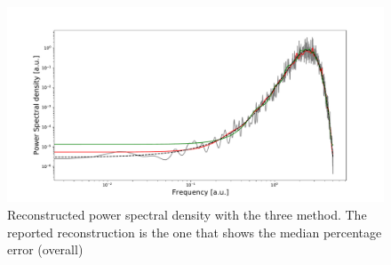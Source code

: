 \documentclass[twocolumn,showpacs,preprintnumbers,nofootinbib,prd,
superscriptaddress,10pt]{revtex4-1}
\begin{document}
\begin{figure}
    \centering
    \includegraphics[width = \linewidth]{Images/NormalPSD/Gaussmedian.pdf}
    \caption{Reconstructed power spectral density with the three method. The reported reconstruction is the one that shows the median percentage error (overall)}
    \label{fig:GaussMedian}
\end{figure}
\end{document}
